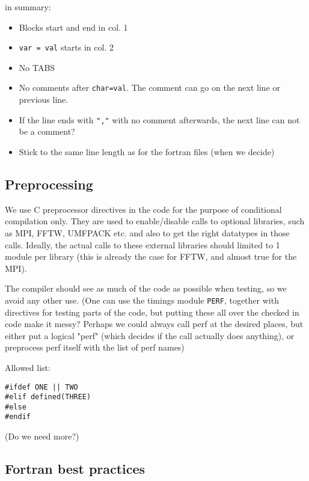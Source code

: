 \documentclass[12pt,twoside,notitlepage,a4paper]{article}
\newcommand{\file}[1]{\texttt{#1}}
\newcommand{\code}[1]{\texttt{#1}}
\begin{document}
in summary:
\begin{itemize}
\item Blocks start and end in col. 1
\item \code{var = val} starts in col. 2
\item No TABS
\item No comments after \code{char=val}. The comment can go on the next line or previous line.
\item If the line ends with \code{","} with no comment afterwards, the next line can not be a comment?
\item Stick to the same line length as for the fortran files (when we decide)
\end{itemize}

\subsection{Preprocessing}

We use C preprocessor directives in the code for the purpose of conditional compilation only.
They are used to enable/disable calls to optional libraries, such as MPI, FFTW, UMFPACK etc.
and also to get the right datatypes in those calls. Ideally, the actual calls to
these external libraries should limited to 1 module per library (this is already the
case for FFTW, and almost true for the MPI).

The compiler should see as much of the code as possible when testing, so we avoid
any other use. (One can use the timings module \file{PERF}, together with directives
for testing parts of the code, but putting these all over the checked in code make it messy?
Perhaps we could always call perf at the desired places, but either put a 
logical "perf" (which decides if the call actually does anything), or preprocess perf itself
with the list of perf names)

Allowed list:
\begin{verbatim}
#ifdef ONE || TWO
#elif defined(THREE)
#else
#endif
\end{verbatim}
(Do we need more?)
\subsection{Fortran best practices}
\end{document}
